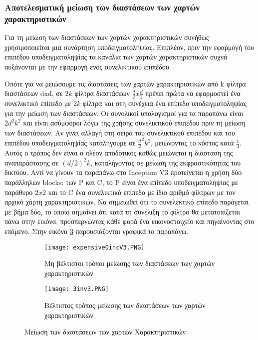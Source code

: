 \subsubsection{Αποτελεσματική μείωση των διαστάσεων των χαρτών χαρακτηριστικών}
\label{subsubsec:3.3.2.4}
Για τη μείωση των διαστάσεων των χαρτών χαρακτηριστικών συνήθως χρησιμοποιείται μια συνάρτηση υποδειγματοληψίας. Επιπλέον, πριν την εφαρμογή του επιπέδου υποδειγματοληψίας τα κανάλια των χαρτών χαρακτηριστικών συχνά αυξάνονται με την εφαρμογή ενός συνελικτικού επιπέδου. 


Οπότε για να μειώσουμε τις διαστάσεις των χαρτών χαρακτηριστικών από k φίλτρα διαστάσεων dxd, σε $2k$ φίλτρα διαστάσεων $\frac{d}{2} x \frac{d}{2}$ πρέπει πρώτα να εφαρμοστεί ένα συνελικτικό επίπεδο με $2k$ φίλτρα και στη συνέχεια ένα επίπεδο υποδειγματοληψίας για την μείωση των διαστάσεων. Οι συνολικοί υπολογισμοί για τα παραπάνω είναι $2d^2 k^2$ και είναι ασύμφοροι λόγω της χρήσης συνελικτικού επιπέδου πριν τη μείωση των διαστάσεων. Αν γίνει αλλαγή στη σειρά του συνελικτικού επιπέδου και του επιπέδου υποδειγματοληψίας καταλήγουμε σε $\frac{d}{2}^2 k^2$, μειώνοντας το κόστος κατά $\frac{1}{4}$. Αυτός ο τρόπος δεν είναι ο πλέον αποδοτικός καθώς μειώνεται η διάσταση της αναπαράστασης σε $(d/2)^2 k$, καταλήγοντας σε μείωση της εκφραστικότητας του δικτύου. Αντί να γίνουν τα παραπάνω στο Inception V3 προτείνεται η χρήση δύο παράλληλων blocks: των P και C, το P είναι ένα επίπεδο υποδειγματοληψίας με παράθυρο $2x2$ και το C ένα συνελικτικό επίπεδο με ίδιο αριθμό φίλτρων με τον αρχικό χάρτη χαρακτηριστικών. Να σημειωθεί ότι το συνελεκτικό επίπεδο παράγεται με βήμα δύο, το οποίο σημαίνει ότι κατά τη συνέλιξη το φίλτρο θα μετατοπίζεται πάνω στην εικόνα, προσπερνώντας κάθε φορά ένα εικονοστοιχείο και πηγαίνοντας στο επόμενο. Στην εικόνα \ref{figure:PC} παρουσιάζονται γραφικά τα παραπάνω.



\begin{figure}[!h]
\centering
\begin{subfigure}{.5\textwidth}
  \centering
  \texttt{[image: expensive0incV3.PNG]}
  \caption{Μη βέλτιστοι τρόποι μείωσης των διαστάσεων των χαρτών χαρακτηριστικών}
  \label{fig:sub1b}
\end{subfigure}%
\begin{subfigure}{.4\textwidth}
  \centering
  \texttt{[image: 3inv3.PNG]}
  \caption{Βέλτιστος τρόπος μείωσης των διαστάσεων των χαρτών χαρακτηριστικών}
  \label{fig:sub2b}
\end{subfigure}
\caption{Μείωση των διαστάσεων των χαρτών Χαρακτηριστικών}
\label{figure:PC}
\end{figure}


